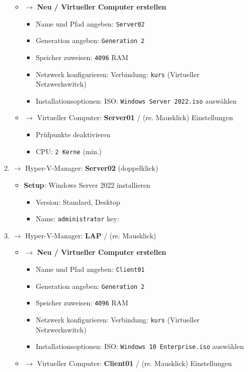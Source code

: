 \begin{enumerate}
  \begin{itemize}
  \item
    $\to$ \textbf{Neu / Virtueller Computer erstellen}

    \begin{itemize}
    \item
      Name und Pfad angeben: \verb|Server02|
    \item
      Generation angeben: \verb|Generation 2|
    \item
      Speicher zuweisen: \verb|4096| RAM
    \item
      Netzwerk konfigurieren: Verbindung: \verb|kurs|
      (Virtueller Netzwerkswitch)
    \item
      Installationsoptionen: ISO:
      \verb|Windows Server 2022.iso| auswählen
    \end{itemize}
  \item
    $\to$ Virtueller Computer: \textbf{Server01} / (re. Mausklick)
    Einstellungen

    \begin{itemize}
    \item
      Prüfpunkte deaktivieren
    \item
      CPU: \verb|2 Kerne| (min.)
    \end{itemize}
  \end{itemize}
\item
  $\to$ Hyper-V-Manager: \textbf{Server02} (doppelklick)

  \begin{itemize}
  \item
    \textbf{Setup}: Windows Server 2022 installieren

    \begin{itemize}
    \item
      Version: Standard, Desktop
    \item
      Name: \verb|administrator| key:
    \end{itemize}
  \end{itemize}
\item
  $\to$ Hyper-V-Manager: \textbf{LAP} / (re. Mausklick)

  \begin{itemize}
  \item
    $\to$ \textbf{Neu / Virtueller Computer erstellen}

    \begin{itemize}
    \item
      Name und Pfad angeben: \verb|Client01|
    \item
      Generation angeben: \verb|Generation 2|
    \item
      Speicher zuweisen: \verb|4096| RAM
    \item
      Netzwerk konfigurieren: Verbindung: \verb|kurs|
      (Virtueller Netzwerkswitch)
    \item
      Installationsoptionen: ISO:
      \verb|Windows 10 Enterprise.iso| auswählen
    \end{itemize}
  \item
    $\to$ Virtueller Computer: \textbf{Client01} / (re. Mausklick)
    Einstellungen


\end{itemize}
\end{enumerate}
